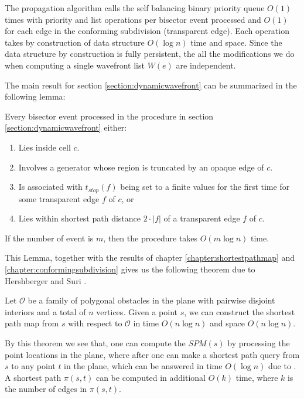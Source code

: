 The propagation algorithm calls the self balancing binary priority queue $O(1)$ times with priority and list operations per bisector event processed and $O(1)$ for each edge in the conforming subdivision (transparent edge). Each operation takes by construction of data structure $O(\log n)$ time and space. Since the data structure by construction is fully persistent, the all the modifications we do when computing a single wavefront list $W(e)$ are independent.

The main result for section \ref{section:dynamicwavefront} can be summarized in the following lemma:

\begin{Lemma} 
Every bisector event processed in the procedure in section \ref{section:dynamicwavefront} either:
\begin{enumerate}
    \item Lies inside cell $c$.
    \item Involves a generator whose region is truncated by an opaque edge of $c$.
    \item Is associated with $t_{stop}(f)$ being set to a finite values for the first time for some transparent edge $f$ of $c$, or
    \item Lies within shortest path distance $2\cdot|f|$ of a transparent edge $f$ of $c$. 
\end{enumerate}
If the number of event is $m$, then the procedure takes $O(m \log n)$ time.
\end{Lemma}

This Lemma, together with the results of chapter \ref{chapter:shortestpathmap} and \ref{chapter:conformingsubdivision} gives us the following theorem due to Hershberger and Suri \cite{HershbergerS99}.

\begin{theorem}
Let $\mathcal{O}$ be a family of polygonal obstacles in the plane with pairwise disjoint interiors and a total of $n$ vertices. Given a
point $s$, we can construct the shortest path map from $s$ with respect to $\mathcal{O}$ in time $O(n \log n)$ and space $O(n \log n)$.
\end{theorem}

By this theorem we see that, one can compute the $SPM(s)$ by processing the point locations in the plane, where after one can make a 
shortest path query from $s$ to any point $t$ in the plane, which can be answered in time $O(\log n)$ due to . A shortest path $\pi(s,t)$ can be computed in additional $O(k)$ time, where $k$ is the number of edges in 
$\pi(s,t)$.


